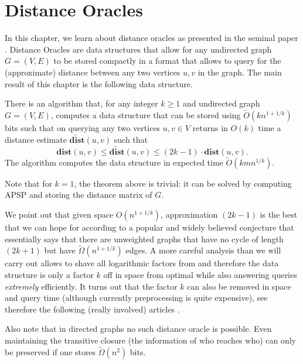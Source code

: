 \chapter{Distance Oracles}

In this chapter, we learn about distance oracles as presented in the seminal paper \cite{thorup2005approximate}. Distance Oracles are data structures that allow for any undirected graph $G =(V,E)$ to be stored compactly in a format that allows to query for the (approximate) distance between any two vertices $u,v$ in the graph. The main result of this chapter is the following data structure.

\begin{theorem}\label{thm:mainDistanceOracle}
There is an algorithm that, for any integer $k \geq 1$ and undirected graph $G=(V,E)$, computes a data structure that can be stored using $\tilde{O}(kn^{1+1/k})$ bits such that on querying any two vertices $u,v \in V$ returns in $O(k)$ time a distance estimate $\widetilde{\mathbf{dist}}(u,v)$ such that
\[
\mathbf{dist}(u,v) \leq \widetilde{\mathbf{dist}}(u,v) \leq (2k-1) \cdot \mathbf{dist}(u,v).
\]
The algorithm computes the data structure in expected time $\tilde{O}(kmn^{1/k})$.
\end{theorem}

\begin{remark}Note that for $k=1$, the theorem above is trivial: it can be solved by computing APSP and storing the distance matrix of $G$.
\end{remark}

\begin{remark}
We point out that given space $O(n^{1+1/k})$, approximation $(2k-1)$ is the best that we can hope for according to a popular and widely believed conjecture that essentially says that there are unweighted graphs that have no cycle of length $(2k+1)$ but have $\tilde{\Omega}(n^{1+1/k})$ edges. A more careful analysis than we will carry out allows to shave all logarithmic factors from  and therefore the data structure is only a factor $k$ off in space from optimal while also answering queries \emph{extremely} efficiently. It turns out that the factor $k$ can also be removed in space and query time (although currently preprocessing is quite expensive), see therefore the following (really involved) articles \cite{chechik2014approximate, chechik2015approximate}.
\end{remark}

\begin{remark}
Also note that in directed graphs no such distance oracle is possible. Even maintaining the transitive closure (the information of who reaches who) can only be preserved if one stores $\tilde{\Omega}(n^2)$ bits.
\end{remark}


